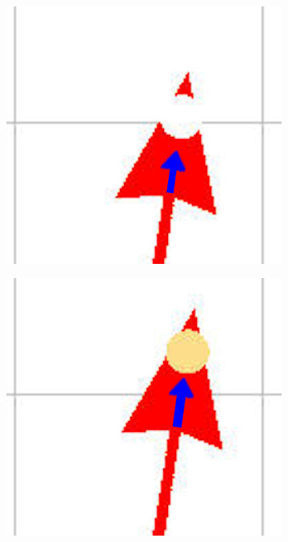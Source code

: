 \documentclass[t1]{penoverslag}
\begin{document}
\begin{figure}
        \centering
        \begin{subfigure}[hb]{0.2\textwidth}
                \centering
                \includegraphics[width=\textwidth]{witte_lijn1}
        \end{subfigure}%
        \begin{subfigure}[hb]{0.2\textwidth}
                \centering
                \includegraphics[width=\textwidth]{witte_lijn2}

\end{subfigure}
\end{figure}
\end{document}

